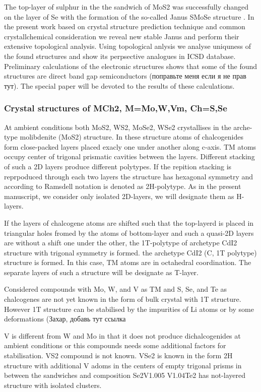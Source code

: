 \documentclass[a4paperm]{article}
\begin{document}
The top-layer of sulphur in the the sandwich of MoS2 was successfully changed on the layer of Se with the formation of the so-called Janus SMoSe structure  \cite{lu2017}.
In the present work based on crystal structure prediction technique and common crystallchemical consideration we reveal new stable Janus and perform their extensive topological analysis.
Using topological anlysis we analyse uniquness of the found structures and show its perpsective analogues in ICSD database.
Preliminary calculations of the electronic structures shows that some of the found structures are direct band gap semiconductors (поправьте меня если я не прав тут).
The special paper will be devoted to the results of these calculations.


\subsubsection{Crystal structures of MCh2, M=Mo,W,Vm, Ch=S,Se}
At ambient conditions both MoS2, WS2, MoSe2, WSe2 crystallises in the arche-type molibdenite (MoS2) structure.
In these structure atoms of chalcogenides form close-packed layers placed exacly one under another along c-axis.
TM atoms occupy center of trigonal prismatic cavities between the layers.
Different stacking of such a 2D layers produce different polytypes.
If the repition stacking is reprpoduced through each two layers the structure has hexagonal symmetry and according to Ramsdell notation is denoted as 2H-polytype. 
As in the present manuscript, we consider only isolated 2D-layers, we will designate them as H-layers.

If the layers of chalcogene atoms are shifted such that the top-layerd is placed in triangular holes fromed by the atoms of bottom-layer and such a quasi-2D layers are without a shift one under the other, the 1T-polytype of archetype CdI2 structure with trigonal symmetry is formed.
the archetype CdI2 (C, 1T polytype) structure is formed. 
In this case, TM atoms are in octahedral coordination.
The separate layers of such a structure will be designate as T-layer.

Considered compounds with Mo, W, and V as TM and S, Se, and Te as chalcogenes are not yet known in the form of bulk crystal with 1T structure.
However 1T structure can be stabilised by the impurities of Li atoms or by some deformations (Захар, добавь тут ссылка

V is different from W and Mo in that it does not produce dichalcogenides at ambient conditions or this compounds needs some additional factors for stabilisation.
VS2 compound is not known.
VSe2 is known in the form 2H structure with additional V adoms in the centers of empty trigonal prisms in between the sandwiches and composition Se2V1.005
V1.04Te2 has not-layered structure with isolated clusters.
\end{document}

